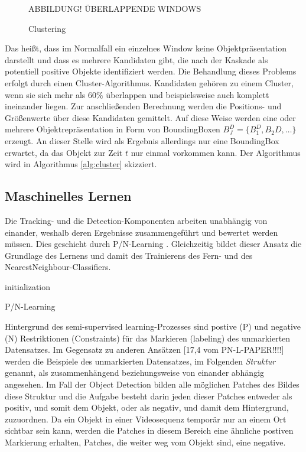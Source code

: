 	\begin{figure}
		\begin{centering}
			ABBILDUNG! ÜBERLAPPENDE WINDOWS
			\caption{Clustering}
			\label{abb:cluster}
			\par
		\end{centering}
	\end{figure}

	Das heißt, dass im Normalfall ein einzelnes Window keine Objektpräsentation darstellt und dass es mehrere Kandidaten gibt, die nach der Kaskade als potentiell positive Objekte identifiziert werden. Die Behandlung dieses Problems erfolgt durch einen Cluster-Algorithmus. Kandidaten gehören zu einem Cluster, wenn sie sich mehr als $60\%$ überlappen und beispielsweise auch komplett ineinander liegen. Zur anschließenden Berechnung werden die Positions- und Größenwerte über diese Kandidaten gemittelt. Auf diese Weise werden eine oder mehrere Objektrepräsentation in Form von BoundingBoxen $B_J^D = \{B_1^D, B_2D, \dots\}$ erzeugt. An dieser Stelle wird als Ergebnis allerdings nur eine BoundingBox erwartet, da das Objekt zur Zeit $t$ nur einmal vorkommen kann. Der Algorithmus wird in Algorithmus \ref{alg:cluster} skizziert.

	\subsection{Maschinelles Lernen}
	\label{subsection:machine_learning}
	Die Tracking- und die Detection-Komponenten arbeiten unabhängig von
	einander, weshalb deren Ergebnisse zusammengeführt und bewertet werden
	müssen. Dies geschieht durch P/N-Learning \cite{PNL}. Gleichzeitig
	bildet dieser Ansatz die Grundlage des Lernens und damit des Trainierens
	des Fern- und des NearestNeighbour-Classifiers. 

	\begin{algorithm}
	\vspace{0.2cm}
	initialization\;
	\caption{P/N-Learning}
	\label{alg:learning}
	\vspace{0.2cm}
	\end{algorithm}

	Hintergrund des semi-supervised learning-Prozesses sind postive (P)
	und negative (N) Restriktionen (Constraints) für das Markieren (labeling)
	des unmarkierten Datensatzes. Im Gegensatz zu anderen Ansätzen {[}17,4
	vom PN-L-PAPER!!!!{]} werden die Beispiele des unmarkierten Datensatzes,
	im Folgenden \textit{Struktur} genannt, als zusammenhängend beziehungsweise
	von einander abhängig angesehen. Im Fall der Object Detection bilden
	alle möglichen Patches des Bildes diese Struktur und die Aufgabe besteht
	darin jeden dieser Patches entweder als positiv, und somit dem Objekt,
	oder als negativ, und damit dem Hintergrund, zuzuordnen. Da ein Objekt
	in einer Videosequenz temporär nur an einem Ort sichtbar sein kann,
	werden die Patches in diesem Bereich eine ähnliche postiven Markierung
	erhalten, Patches, die weiter weg vom Objekt sind, eine negative.

